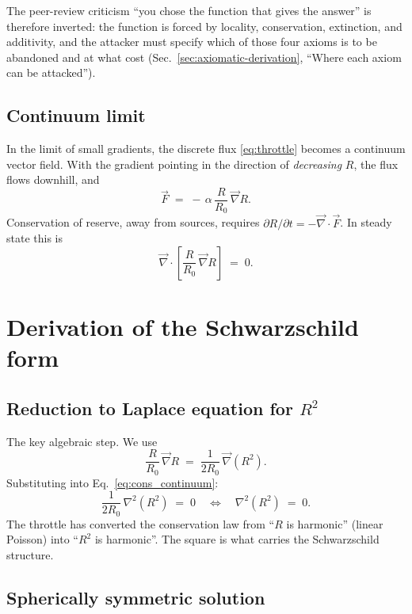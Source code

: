 \documentclass[11pt,a4paper]{article}
\begin{document}
The peer-review criticism ``you chose the function that gives
the answer'' is therefore inverted: the function is forced by
locality, conservation, extinction, and additivity, and the
attacker must specify which of those four axioms is to be
abandoned and at what cost (Sec.~\ref{sec:axiomatic-derivation},
``Where each axiom can be attacked'').

\subsection{Continuum limit}

In the limit of small gradients, the discrete flux
\eqref{eq:throttle} becomes a continuum vector field. With the
gradient pointing in the direction of \emph{decreasing} $R$,
the flux flows downhill, and
\begin{equation}
\vec{F} \;=\; -\,\alpha\, \frac{R}{R_0}\, \vec{\nabla} R.
\label{eq:F_continuum}
\end{equation}
Conservation of reserve, away from sources, requires
$\partial R/\partial t = -\vec{\nabla} \cdot \vec{F}$. In
steady state this is
\begin{equation}
\vec{\nabla} \cdot \!\left[\frac{R}{R_0}\,\vec{\nabla} R\right]
\;=\; 0.
\label{eq:cons_continuum}
\end{equation}

\section{Derivation of the Schwarzschild form}
\label{sec:derivation}

\subsection{Reduction to Laplace equation for $R^2$}

The key algebraic step. We use
\[
\frac{R}{R_0}\,\vec{\nabla} R \;=\;
\frac{1}{2 R_0}\,\vec{\nabla}(R^2).
\]
Substituting into Eq.~\eqref{eq:cons_continuum}:
\begin{equation}
\frac{1}{2 R_0}\,\nabla^2(R^2) \;=\; 0
\quad\Longleftrightarrow\quad
\boxed{\nabla^2(R^2) \;=\; 0.}
\label{eq:laplace_R2}
\end{equation}
The throttle has converted the conservation law from
``$R$ is harmonic'' (linear Poisson) into ``$R^2$ is
harmonic''. The square is what carries the Schwarzschild
structure.

\subsection{Spherically symmetric solution}
\end{document}
